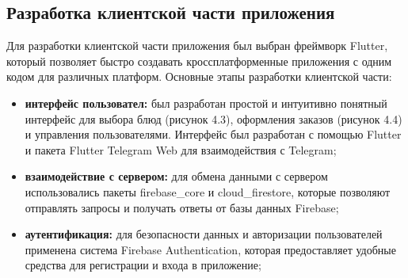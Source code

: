 {    \subsection{Разработка клиентской части приложения}
    {
        Для разработки клиентской части приложения был выбран фреймворк Flutter, который позволяет быстро создавать кроссплатформенные приложения с одним кодом для различных платформ. Основные этапы разработки клиентской части:
        \begin{itemize}
            \item \textbf{интерфейс пользовател:} был разработан простой и интуитивно понятный интерфейс для выбора блюд (рисунок 4.3), оформления заказов (рисунок 4.4) и управления пользователями. Интерфейс был разработан с помощью Flutter и пакета Flutter Telegram Web для взаимодействия с Telegram;
            \item \textbf{взаимодействие с сервером:} для обмена данными с сервером использовались пакеты firebase\_core и cloud\_firestore, которые позволяют отправлять запросы и получать ответы от базы данных Firebase;
            \item \textbf{аутентификация:} для безопасности данных и авторизации пользователей применена система Firebase Authentication, которая предоставляет удобные средства для регистрации и входа в приложение; 
        \end{itemize}
        \begin{figure}[H]
            \centering
            \begin{minipage}{0.45\textwidth}
                \centering

\end{minipage}
\end{figure}}}

